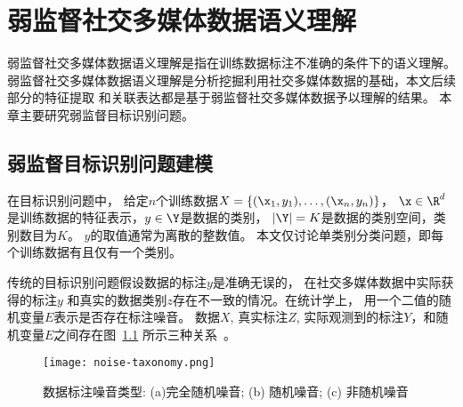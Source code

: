 \chapter{弱监督社交多媒体数据语义理解}
    弱监督社交多媒体数据语义理解是指在训练数据标注不准确的条件下的语义理解。
    弱监督社交多媒体数据语义理解是分析挖掘利用社交多媒体数据的基础，本文后续部分的特征提取
    和关联表达都是基于弱监督社交多媒体数据予以理解的结果。
    本章主要研究弱监督目标识别问题。

\section{弱监督目标识别问题建模}
在目标识别问题中， 给定$n$个训练数据$X=\{(\x_1, y_1), \ldots,
(\x_n, y_n)\}$， $\x \in \R^d$是训练数据的特征表示，$y \in
\Y$是数据的类别， $|\Y| = K$是数据的类别空间，类别数目为$K$。
$y$的取值通常为离散的整数值。 本文仅讨论单类别分类问题，即每个训练数据有且仅有一个类别。

传统的目标识别问题假设数据的标注$y$是准确无误的，
在社交多媒体数据中实际获得的标注$y$
和真实的数据类别$z$存在不一致的情况。在统计学上，
用一个二值的随机变量$E$表示是否存在标注噪音。
数据$X$, 真实标注$Z$,
实际观测到的标注$Y$，和随机变量$E$之间存在图~\ref{fig:noise-taxonomy}
所示三种关系~\citep{frenay2014classification}。

\begin{figure}[ht]
    \texttt{[image: noise-taxonomy.png]}
    \caption{数据标注噪音类型: (a)完全随机噪音; (b) 随机噪音; (c) 非随机噪音}\label{fig:noise-taxonomy}
\end{figure}

